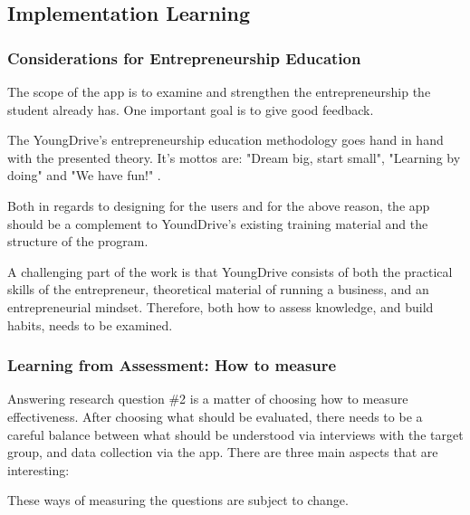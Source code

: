 \subsection{Implementation Learning}

\subsubsection{Considerations for Entrepreneurship Education}
The scope of the app is to examine and strengthen the entrepreneurship the student already has. One important goal is to give good feedback.

The YoungDrive's entrepreneurship education methodology goes hand in hand with the presented theory. It's mottos are: "Dream big, start small", "Learning by doing" and "We have fun!" \cite{youngdrive}.

Both in regards to designing for the users and for the above reason, the app should be a complement to YoundDrive's existing training material and the structure of the program.

A challenging part of the work is that YoungDrive consists of both the practical skills of the entrepreneur, theoretical material of running a business, and an entrepreneurial mindset. Therefore, both how to assess knowledge, and build habits, needs to be examined.

\subsubsection{Learning from Assessment: How to measure}

Answering research question \#2 is a matter of choosing how to measure effectiveness. After choosing what should be evaluated, there needs to be a careful balance between what should be understood via interviews with the target group, and data collection via the app. There are three main aspects that are interesting:

These ways of measuring the questions are subject to change.


